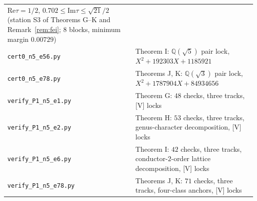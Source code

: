 \documentclass[11pt]{article}
\newcommand{\Qq}{\mathbb{Q}}
\newcommand{\ReT}{\mathrm{Re}}
\newcommand{\ImT}{\mathrm{Im}}
\theoremstyle{definition}
\theoremstyle{remark}
\begin{document}
\begin{center}
\begin{tabular}{lp{9.6cm}}
  $\ReT\tau=1/2$, $0.702\le\ImT\tau\le\sqrt{21}/2$ (station S3 of
  Theorems G--K and Remark~\ref{rem:fei}; $8$ blocks, minimum margin
  $0.00729$) \\
\texttt{cert0\_n5\_e56.py} & Theorem I: $\Qq(\sqrt5)$ pair lock,
  $X^2+192303X+1185921$ \\
\texttt{cert0\_n5\_e78.py} & Theorems J, K: $\Qq(\sqrt3)$ pair lock,
  $X^2+1787904X+84934656$ \\
\texttt{verify\_P1\_n5\_e1.py} & Theorem G: $48$ checks, three
  tracks, [V] locks \\
\texttt{verify\_P1\_n5\_e2.py} & Theorem H: $53$ checks, three
  tracks, genus-character decomposition, [V] locks \\
\texttt{verify\_P1\_n5\_e6.py} & Theorem I: $42$ checks, three
  tracks, conductor-$2$-order lattice decomposition, [V] locks \\
\texttt{verify\_P1\_n5\_e78.py} & Theorems J, K: $71$ checks, three
  tracks, four-class anchors, [V] locks \\
\bottomrule
\end{tabular}
\end{center}
\end{document}
